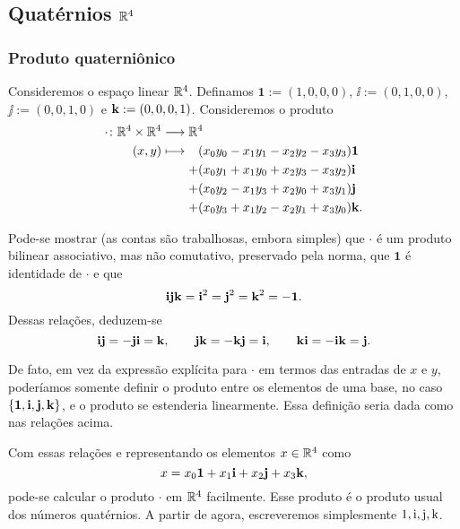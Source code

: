 \subsection{Quatérnios $\mathbb{R}^4$}

\subsubsection{Produto quaterniônico}

Consideremos o espaço linear $\mathbb{R}^4$. Definamos $\bm 1 := (1,0,0,0)$, $\bm \ii := (0,1,0,0)$, $\bm \jj := (0,0,1,0)$ e $\bm {\mathrm{k}} := (0,0,0,1)$. Consideremos o produto
	\begin{align*}
	\func{\cdot}{\R^4 \times \R^4}{\R^4}{(x,y)}{
		\begin{aligned}[t]
		&(x_0y_0 - x_1y_1 - x_2y_2 - x_3y_3) \bm 1 \\
			+ &(x_0y_1+x_1y_0+x_2y_3-x_3y_2) \bm\ii \\
			+ &(x_0y_2-x_1y_3+x_2y_0+x_3y_1) \bm\jj \\
			+ &(x_0y_3+x_1y_2-x_2y_1+x_3y_0) \bm\kk .
		\end{aligned}
	}
	\end{align*}

Pode-se mostrar (as contas são trabalhosas, embora simples) que $\cdot$ é um produto bilinear associativo, mas não comutativo, preservado pela norma, que $\bm 1$ é identidade de $\cdot$ e que
	\begin{equation*}
	\bm{\mathrm{i}}\bm{\mathrm{j}}\bm{\mathrm{k}} = \bm{\mathrm{i}}^2 = \bm{\mathrm{j}}^2 = \bm{\mathrm{k}}^2 = -\bm 1.
	\end{equation*}
Dessas relações, deduzem-se
	\begin{equation*}
	\bm{\mathrm{i}}\bm{\mathrm{j}} = -\bm{\mathrm{j}}\bm{\mathrm{i}} = \bm{\mathrm{k}}, \qquad \bm{\mathrm{j}}\bm{\mathrm{k}} = -\bm{\mathrm{k}}\bm{\mathrm{j}} = \bm{\mathrm{i}}, \qquad \bm{\mathrm{k}}\bm{\mathrm{i}} = -\bm{\mathrm{i}}\bm{\mathrm{k}} = \bm{\mathrm{j}}.
	\end{equation*}

De fato, em vez da expressão explícita para $\cdot$ em termos das entradas de $x$ e $y$, poderíamos somente definir o produto entre os elementos de uma base, no caso $\{\bm 1,\bm {\mathrm{i}}, \bm {\mathrm{j}}, \bm {\mathrm{k}}\}$, e o produto se estenderia linearmente. Essa definição seria dada como nas relações acima.

Com essas relações e representando os elementos $x \in \mathbb{R}^4$ como
	\begin{equation*}
	x = x_0\bm 1 + x_1\bm {\mathrm{i}} + x_2 \bm {\mathrm{j}} + x_3 \bm {\mathrm{k}},
	\end{equation*}
pode-se calcular o produto $\cdot$ em $\mathbb{R}^4$ facilmente. Esse produto é o produto usual dos números quatérnios. A partir de agora, escreveremos simplesmente $1, \mathrm{i}, \mathrm{j}, \mathrm{k}$.

